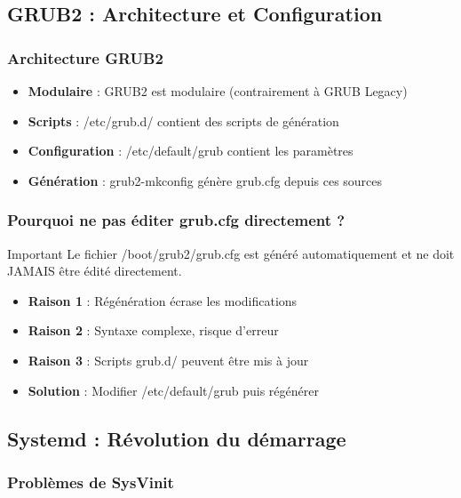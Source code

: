 \documentclass[12pt,a4paper]{article}
\begin{document}
\subsection{GRUB2 : Architecture et Configuration}

\subsubsection{Architecture GRUB2}

\begin{itemize}
    \item \textbf{Modulaire} : GRUB2 est modulaire (contrairement à GRUB Legacy)
    \item \textbf{Scripts} : /etc/grub.d/ contient des scripts de génération
    \item \textbf{Configuration} : /etc/default/grub contient les paramètres
    \item \textbf{Génération} : grub2-mkconfig génère grub.cfg depuis ces sources
\end{itemize}

\subsubsection{Pourquoi ne pas éditer grub.cfg directement ?}

\begin{infobox}{Important}
Le fichier /boot/grub2/grub.cfg est généré automatiquement et ne doit JAMAIS être édité directement.
\end{infobox}

\begin{itemize}
    \item \textbf{Raison 1} : Régénération écrase les modifications
    \item \textbf{Raison 2} : Syntaxe complexe, risque d'erreur
    \item \textbf{Raison 3} : Scripts grub.d/ peuvent être mis à jour
    \item \textbf{Solution} : Modifier /etc/default/grub puis régénérer
\end{itemize}

\subsection{Systemd : Révolution du démarrage}

\subsubsection{Problèmes de SysVinit}
\end{document}
